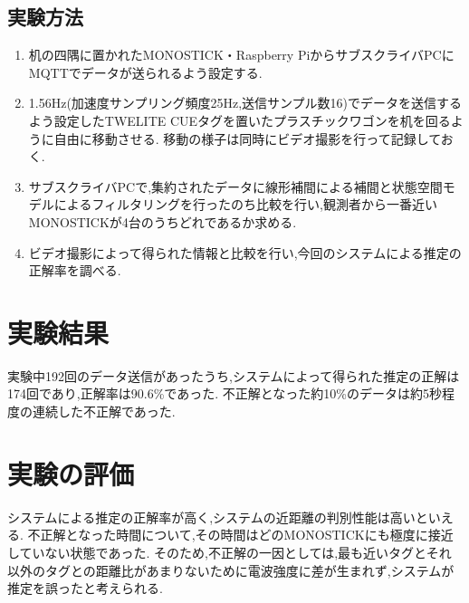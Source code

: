 \subsection{実験方法}

\begin{enumerate}
  \item 机の四隅に置かれたMONOSTICK・Raspberry PiからサブスクライバPCにMQTTでデータが送られるよう設定する.
  \item 1.56Hz(加速度サンプリング頻度25Hz,送信サンプル数16)でデータを送信するよう設定したTWELITE CUEタグを置いたプラスチックワゴンを机を回るように自由に移動させる.
  移動の様子は同時にビデオ撮影を行って記録しておく.
  \item サブスクライバPCで,集約されたデータに線形補間による補間と状態空間モデルによるフィルタリングを行ったのち比較を行い,観測者から一番近いMONOSTICKが4台のうちどれであるか求める.
  \item ビデオ撮影によって得られた情報と比較を行い,今回のシステムによる推定の正解率を調べる.
\end{enumerate}


\section{実験結果}
実験中192回のデータ送信があったうち,システムによって得られた推定の正解は174回であり,正解率は90.6\%であった.
不正解となった約10\%のデータは約5秒程度の連続した不正解であった.

\section{実験の評価}
システムによる推定の正解率が高く,システムの近距離の判別性能は高いといえる.
不正解となった時間について,その時間はどのMONOSTICKにも極度に接近していない状態であった.
そのため,不正解の一因としては,最も近いタグとそれ以外のタグとの距離比があまりないために電波強度に差が生まれず,システムが推定を誤ったと考えられる.












